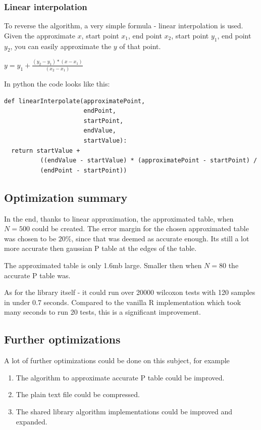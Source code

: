 \documentclass[12pt]{article}
\begin{document}
\subsubsection{Linear interpolation}
To reverse the algorithm, a very simple formula - linear interpolation is used. Given the approximate $x$, start point $x_1$, end point $x_2$, start point $y_1$, end point $y_2$, you can easily approximate the $y$ of that point.

$y = y_1 + \frac{(y_2 - y_1) * (x - x_1)}{(x_2 - x_1)}$

In python the code looks like this:

\begin{verbatim}
def linearInterpolate(approximatePoint,
                      endPoint,
                      startPoint,
                      endValue,
                      startValue):
  return startValue +
          ((endValue - startValue) * (approximatePoint - startPoint) /
          (endPoint - startPoint))
\end{verbatim}

\subsection{Optimization summary}
In the end, thanks to linear approximation, the approximated table, when $N=500$ could be created. The error margin for the chosen approximated table was chosen to be $20\%$, since that was deemed as accurate enough. Its still a lot more accurate then gaussian P table at the edges of the table.

The approximated table is only 1.6mb large. Smaller then when $N=80$ the accurate P table was.

As for the library itself - it could run over 20000 wilcoxon tests with 120 samples in under 0.7 seconds. Compared to the vanilla R implementation which took many seconds to run 20 tests, this is a significant improvement.

\subsection{Further optimizations}
A lot of further optimizations could be done on this subject, for example

\begin{enumerate}
\item The algorithm to approximate accurate P table could be improved.
\item The plain text file could be compressed.
\item The shared library algorithm implementations could be improved and expanded.
\end{enumerate}
\end{document}
